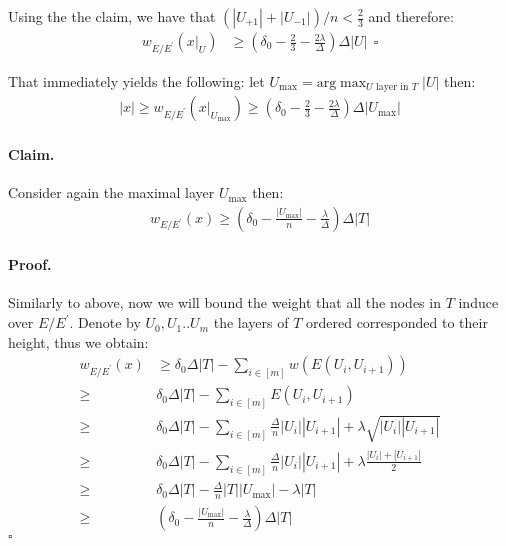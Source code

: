 \documentclass{article}
\begin{document}
\begin{multicols*}{2}
  Using the the claim, we have that $\left( |U_{+1}| + |U_{-1}| \right)/n <\frac{2}{3} $ and therefore:
  \begin{equation*}
    \begin{split}
      w_{E/E^{\prime}}\left( x|_{U} \right) & \ge \left( \delta_{0} - \frac{2}{3} - \frac{2\lambda}{\Delta} \right) \Delta |U| \ \  \square 
    \end{split}
  \end{equation*}

  That immediately yields the following: let $U_{\text{max}} = \text{arg} \max_{U \text{ layer in }  T } |U|  $  then: 
  \begin{equation*}
    \begin{split}
      |x| \ge  w_{E/E^{\prime}}\left( x|_{U_{\text{max}}} \right) \ge \left( \delta_{0} - \frac{2}{3} - \frac{2\lambda}{\Delta} \right)\Delta |U_{\text{max}}|
    \end{split}
  \end{equation*}
  \paragraph{Claim.} Consider again the maximal layer $U_{\max}$ then: 
  \begin{equation*}
    \begin{split}
      w_{E/E^{\prime}}\left( x \right) \ge \left( \delta_{0} - \frac{|U_{\max}|}{n} - \frac{\lambda}{\Delta} \right) \Delta|T| 
    \end{split}
  \end{equation*}
  \paragraph{Proof.} Similarly to above, now we will bound the weight that all the nodes in $T$ induce over $E/E^{\prime}$. Denote by $U_{0}, U_{1} .. U_{m}$ the layers of $T$ ordered corresponded to their height, thus we obtain: 
  \begin{equation*}
    \begin{split}
      w_{E/E^{\prime}}\left( x \right) & \ge \delta_{0}\Delta|T| - \sum_{i\in [m]}{ w \left( E\left( U_{i}, U_{i+1}  \right) \right)  } \\ 
      \ge & \delta_{0}\Delta|T|  - \sum_{i \in [m]}{ E\left( U_{i}, U_{i+1}  \right)  } \\ 
      \ge & \delta_{0}\Delta|T|  -  \sum_{i \in [m]}{ \frac{\Delta}{n}|U_{i}| |U_{i+1}| + \lambda \sqrt{ |U_{i}| |U_{i+1}|} }\\ 
      \ge & \delta_{0}\Delta|T|  -  \sum_{i \in [m]}{ \frac{\Delta}{n}|U_{i}| |U_{i+1}| + \lambda \frac{ |U_{i}|+ |U_{i+1}|}{2 } }\\ 
      \ge & \delta_{0}\Delta|T|  - \frac{\Delta}{n}|T||U_{\max}| -  \lambda |T| \\ 
      \ge & \left( \delta_{0} - \frac{|U_{\max}| }{n}-  \frac{\lambda}{\Delta} \right) \Delta|T| 
    \end{split}
  \end{equation*}
  $\square$

\end{multicols*}
\end{document}

